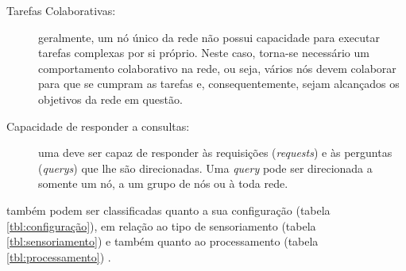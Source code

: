 \begin{description}
	\item[Tarefas Colaborativas: ] geralmente, um nó único da rede não possui capacidade para executar tarefas complexas por si próprio. Neste caso, torna-se necessário um comportamento colaborativo na rede, ou seja, vários nós devem colaborar para que se cumpram as tarefas e, consequentemente, sejam alcançados os objetivos da rede em questão.

	\item[Capacidade de responder a consultas: ] uma \rssf deve ser capaz de responder às requisições (\emph{requests}) e às perguntas (\emph{querys}) que lhe são direcionadas. Uma \emph{query} pode ser direcionada a somente um nó, a um grupo de nós ou à toda rede.

\end{description}

\rssfs também podem ser classificadas quanto a sua configuração (tabela \ref{tbl:configuração}), em relação ao tipo de sensoriamento (tabela \ref{tbl:sensoriamento}) e também quanto ao processamento (tabela \ref{tbl:processamento}) \cite{Ruiz2004}.

\pagebreak

